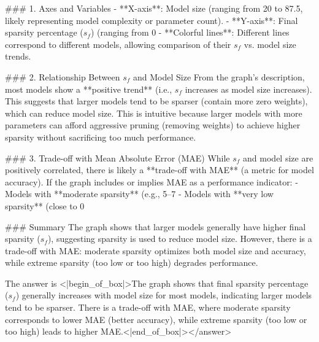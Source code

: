 ### 1. Axes and Variables  
- **X-axis**: Model size (ranging from 20 to 87.5, likely representing model complexity or parameter count).  
- **Y-axis**: Final sparsity percentage (\(s_f\)) (ranging from 0%
- **Colorful lines**: Different lines correspond to different models, allowing comparison of their \(s_f\) vs. model size trends.    

### 2. Relationship Between \(s_f\) and Model Size  
From the graph’s description, most models show a **positive trend** (i.e., \(s_f\) increases as model size increases). This suggests that larger models tend to be sparser (contain more zero weights), which can reduce model size. This is intuitive because larger models with more parameters can afford aggressive pruning (removing weights) to achieve higher sparsity without sacrificing too much performance.    

### 3. Trade-off with Mean Absolute Error (MAE)  
While \(s_f\) and model size are positively correlated, there is likely a **trade-off with MAE** (a metric for model accuracy). If the graph includes or implies MAE as a performance indicator:  
- Models with **moderate sparsity** (e.g., 5–7%
- Models with **very low sparsity** (close to 0%

### Summary  
The graph shows that larger models generally have higher final sparsity (\(s_f\)), suggesting sparsity is used to reduce model size. However, there is a trade-off with MAE: moderate sparsity optimizes both model size and accuracy, while extreme sparsity (too low or too high) degrades performance.  

The answer is <|begin_of_box|>The graph shows that final sparsity percentage (\(s_f\)) generally increases with model size for most models, indicating larger models tend to be sparser. There is a trade-off with MAE, where moderate sparsity corresponds to lower MAE (better accuracy), while extreme sparsity (too low or too high) leads to higher MAE.<|end_of_box|></answer>